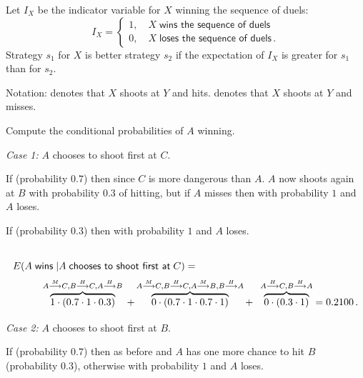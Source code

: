 \solution{}

Let $I_X$ be the indicator variable for $X$ winning the sequence of duels:
\[
I_X=
\left\{
\begin{array}{ll}
1,\quad X\;\textsf{wins the sequence of duels}\\
0, \quad X\; \textsf{loses the sequence of duels}\,.
\end{array}
\right.
\]
Strategy $s_1$ for $X$ is better strategy $s_2$ if the expectation of $I_X$ is greater for $s_1$ than for $s_2$.

Notation:  denotes that $X$ shoots at $Y$ and hits.  denotes that $X$ shoots at $Y$ and misses.

Compute the conditional probabilities of $A$ winning.

\textit{Case 1:} $A$ chooses to shoot first at $C$.

If  (probability $0.7$) then  since $C$ is more dangerous than $A$. $A$ now shoots again at $B$ with probability $0.3$ of hitting, but if $A$ misses then  with probability $1$ and $A$ loses.

If  (probability $0.3$) then  with probability $1$ and $A$ loses.

\vspace*{-3ex}
\[
\renewcommand*{\arraystretch}{2.5}
\begin{array}{l}
E(A \;\textsf{wins}\;|A\;\textsf{chooses to shoot first at}\;C) =\\
%
\qquad\quad \overbrace{1\cdot (0.7\cdot 1 \cdot 0.3)}^%
{\duelmath{A}{M}{C}, \duelmath{B}{H}{C}, \duelmath{A}{H}{B}}\; +
%
\overbrace{0\cdot (0.7\cdot 1\cdot 0.7\cdot 1)}^%
{\duelmath{A}{M}{C},  \duelmath{B}{H}{C}, \duelmath{A}{M}{B}, \duelmath{B}{H}{A}}+
%
\;\;\overbrace{0\cdot (0.3\cdot 1)}^%
{\duelmath{A}{H}{C}, \duelmath{B}{H}{A}}=0.2100\,.
\end{array}
\]
\textit{Case 2:} $A$ chooses to shoot first at $B$.

If  (probability $0.7$) then as before  and $A$ has one more chance to hit $B$ (probability $0.3$), otherwise  with probability $1$ and $A$ loses.


